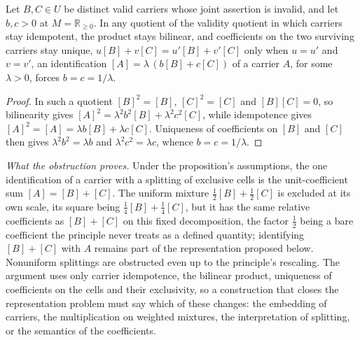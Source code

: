 \begin{prop}\label{prop:splitting-obstruction}
Let $B, C \in U$ be distinct valid carriers whose joint assertion is invalid, and let $b, c > 0$ at $M = \mathbb{R}_{\ge 0}$. In any quotient of the validity quotient in which carriers stay idempotent, the product stays bilinear, and coefficients on the two surviving carriers stay unique, $u[B] + v[C] = u'[B] + v'[C]$ only when $u = u'$ and $v = v'$, an identification $[A] = \lambda\,(b[B] + c[C])$ of a carrier $A$, for some $\lambda > 0$, forces $b = c = 1/\lambda$.
\end{prop}
\begin{proof}
In such a quotient $[B]^{2} = [B]$, $[C]^{2} = [C]$ and $[B][C] = 0$, so bilinearity gives $[A]^{2} = \lambda^{2} b^{2} [B] + \lambda^{2} c^{2} [C]$, while idempotence gives $[A]^{2} = [A] = \lambda b [B] + \lambda c [C]$. Uniqueness of coefficients on $[B]$ and $[C]$ then gives $\lambda^{2} b^{2} = \lambda b$ and $\lambda^{2} c^{2} = \lambda c$, whence $b = c = 1/\lambda$.
\end{proof}
\noindent\textit{What the obstruction proves.} Under the proposition's assumptions, the one identification of a carrier with a splitting of exclusive cells is the unit-coefficient sum $[A] = [B] + [C]$. The uniform mixture $\tfrac12[B] + \tfrac12[C]$ is excluded at its own scale, its square being $\tfrac14[B] + \tfrac14[C]$, but it has the same relative coefficients as $[B] + [C]$ on this fixed decomposition, the factor $\tfrac12$ being a bare coefficient the principle never treats as a defined quantity; identifying $[B] + [C]$ with $A$ remains part of the representation proposed below. Nonuniform splittings are obstructed even up to the principle's rescaling. The argument uses only carrier idempotence, the bilinear product, uniqueness of coefficients on the cells and their exclusivity, so a construction that closes the representation problem must say which of these changes: the embedding of carriers, the multiplication on weighted mixtures, the interpretation of splitting, or the semantics of the coefficients.

